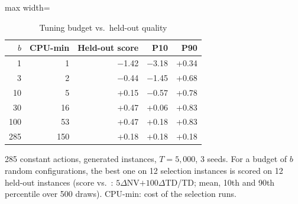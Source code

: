 \begin{table}[t]
\centering
\caption{Tuning budget vs.\ held-out quality}\label{tab:tuning}
\setlength{\tabcolsep}{3pt}
\begin{adjustbox}{max width=\linewidth}
\begin{tabular}{rrrrr}
\toprule
$b$ & CPU-min & Held-out score & P10 & P90\\ \midrule
1 & 1 & $-$1.42 & $-$3.18 & +0.34\\
3 & 2 & $-$0.44 & $-$1.45 & +0.68\\
10 & 5 & +0.15 & $-$0.57 & +0.78\\
30 & 16 & +0.47 & +0.06 & +0.83\\
100 & 53 & +0.47 & +0.18 & +0.83\\
285 & 150 & +0.18 & +0.18 & +0.18\\
\bottomrule
\end{tabular}
\end{adjustbox}
\par\vspace{2pt}\parbox{\linewidth}{\footnotesize 285 constant actions, generated instances, $T=5{,}000$, 3 seeds. For a budget of $b$ random configurations, the best one on 12 selection instances is scored on 12 held-out instances (score vs.\ \Rw{}: $5\Delta$NV$+100\Delta$TD/TD; mean, 10th and 90th percentile over 500 draws). CPU-min: cost of the selection runs.}
\end{table}

